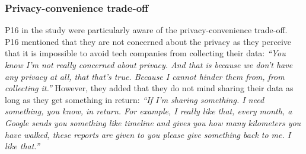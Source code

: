     \subsubsection{Privacy-convenience trade-off}
        P16 in the study were particularly aware of the privacy-convenience trade-off.
        P16 mentioned that they are not concerned about the privacy as they perceive that it is impossible to avoid tech companies from collecting their data:
        \textit{``You know I'm not really concerned about privacy. And that is because we don't have any privacy at all, that that's true. Because I cannot hinder them from, from collecting it.''}
        However, they added that they do not mind sharing their data as long as they get something in return:
        \textit{``If I'm sharing something. I need something, you know, in return. For example, I really like that, every month, a Google sends you something like timeline and gives you how many kilometers you have walked, these reports are given to you please give something back to me. I like that.''}
        
